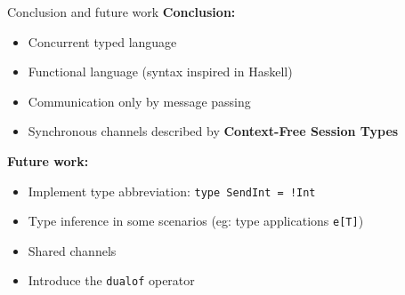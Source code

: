 \documentclass[unknownkeysallowed]{beamer}
\begin{document}
 \lstset{language=CFST, style=eclipse}
 \begin{frame}[fragile]{Conclusion and future work}
  \textbf{Conclusion:}
  \begin{itemize}
  \item Concurrent typed language
  \item Functional language (syntax inspired in Haskell)
  \item Communication only by message passing
  \item Synchronous channels described by \textbf{Context-Free Session Types}
  \end{itemize}
  \pause
  \textbf{Future work:}
  \begin{itemize}
  \item Implement type abbreviation: \lstinline{type SendInt = !Int}
  \item Type inference in some scenarios (eg: type applications \lstinline|e[T]|)
  \item Shared channels
  \item Introduce the \lstinline|dualof| operator
  \end{itemize}
\end{frame}
\end{document}
